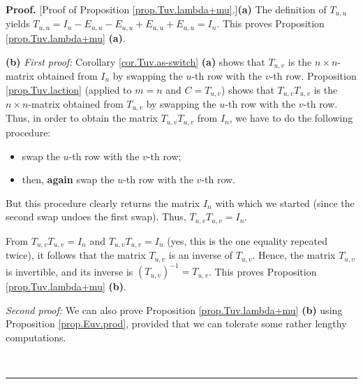\documentclass[numbers=enddot,12pt,final,onecolumn,notitlepage]{scrartcl}%
\theoremstyle{definition}
\newenvironment{proof}[1][Proof]{\noindent\textbf{#1.} }{\ \rule{0.5em}{0.5em}}
\begin{document}
\begin{proof}
[Proof of Proposition \ref{prop.Tuv.lambda+mu}.]\textbf{(a)} The definition of
$T_{u,u}$ yields $T_{u,u}=I_{n}-E_{u,u}-E_{u,u}+E_{u,u}+E_{u,u}=I_{n}$. This
proves Proposition \ref{prop.Tuv.lambda+mu} \textbf{(a)}.

\textbf{(b)} \textit{First proof:} Corollary \ref{cor.Tuv.as-switch}
\textbf{(a)} shows that $T_{u,v}$ is the $n\times n$-matrix obtained from
$I_{n}$ by swapping the $u$-th row with the $v$-th row. Proposition
\ref{prop.Tuv.laction} (applied to $m=n$ and $C=T_{u,v}$) shows that
$T_{u,v}T_{u,v}$ is the $n\times n$-matrix obtained from $T_{u,v}$ by swapping
the $u$-th row with the $v$-th row. Thus, in order to obtain the matrix
$T_{u,v}T_{u,v}$ from $I_{n}$, we have to do the following procedure:

\begin{itemize}
\item swap the $u$-th row with the $v$-th row;

\item then, \textbf{again} swap the $u$-th row with the $v$-th row.
\end{itemize}

But this procedure clearly returns the matrix $I_{n}$ with which we started
(since the second swap undoes the first swap). Thus, $T_{u,v}T_{u,v}=I_{n}$.

From $T_{u,v}T_{u,v}=I_{n}$ and $T_{u,v}T_{u,v}=I_{n}$ (yes, this is the one
equality repeated twice), it follows that the matrix $T_{u,v}$ is an inverse
of $T_{u,v}$. Hence, the matrix $T_{u,v}$ is invertible, and its inverse is
$\left(  T_{u,v}\right)  ^{-1}=T_{u,v}$. This proves Proposition
\ref{prop.Tuv.lambda+mu} \textbf{(b)}.

\textit{Second proof:} We can also prove Proposition \ref{prop.Tuv.lambda+mu}
\textbf{(b)} using Proposition \ref{prop.Euv.prod}, provided that we can
tolerate some rather lengthy computations.


\end{proof}
\end{document}
